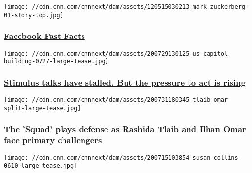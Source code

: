 \href{/2014/02/11/world/facebook-fast-facts/index.html}{}

\texttt{[image: //cdn.cnn.com/cnnnext/dam/assets/120515030213-mark-zuckerberg-01-story-top.jpg]}

\hypertarget{facebook-fast-facts}{%
\subsubsection{\texorpdfstring{\href{/2014/02/11/world/facebook-fast-facts/index.html}{Facebook
Fast Facts}}{Facebook Fast Facts}}\label{facebook-fast-facts}}

\href{/2020/08/02/investing/stocks-week-ahead/index.html}{}

\texttt{[image: //cdn.cnn.com/cnnnext/dam/assets/200729130125-us-capitol-building-0727-large-tease.jpg]}

\hypertarget{stimulus-talks-have-stalled-but-the-pressure-to-act-is-rising}{%
\subsubsection{\texorpdfstring{\href{/2020/08/02/investing/stocks-week-ahead/index.html}{Stimulus
talks have stalled. But the pressure to act is
rising}}{Stimulus talks have stalled. But the pressure to act is rising}}\label{stimulus-talks-have-stalled-but-the-pressure-to-act-is-rising}}

\href{/2020/08/02/politics/rashida-tlaib-ilhan-omar-primaries/index.html}{}

\texttt{[image: //cdn.cnn.com/cnnnext/dam/assets/200731180345-tlaib-omar-split-large-tease.jpg]}

\hypertarget{the-squad-plays-defense-as-rashida-tlaib-and-ilhan-omar-face-primary-challengers}{%
\subsubsection{\texorpdfstring{\href{/2020/08/02/politics/rashida-tlaib-ilhan-omar-primaries/index.html}{The
'Squad' plays defense as Rashida Tlaib and Ilhan Omar face primary
challengers}}{The 'Squad' plays defense as Rashida Tlaib and Ilhan Omar face primary challengers}}\label{the-squad-plays-defense-as-rashida-tlaib-and-ilhan-omar-face-primary-challengers}}

\href{/2020/08/02/politics/donald-trump-senate-election/index.html}{}

\texttt{[image: //cdn.cnn.com/cnnnext/dam/assets/200715103854-susan-collins-0610-large-tease.jpg]}

